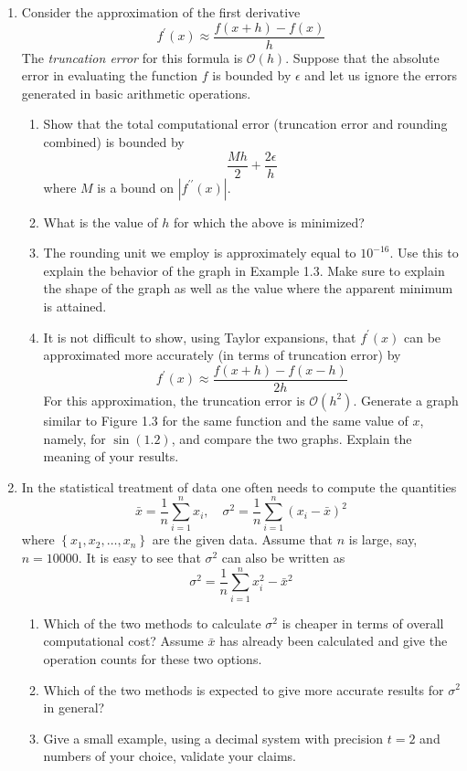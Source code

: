 \documentclass[12pt]{article}
\begin{document}
\begin{enumerate}
\item Consider the approximation of the first derivative
\[
f^{\prime}(x) \approx \frac{f(x+h)-f(x)}{h}
\]
The {\em truncation error} for this formula is $\mathcal{O}(h)$. Suppose that the
absolute error in evaluating the function $f$ is bounded by $\epsilon$ and
let us ignore the errors generated in basic arithmetic operations.
\begin{enumerate}
\item Show that the total computational error (truncation error and rounding combined)
is bounded by
\[
\frac{Mh}{2} + \frac{2\epsilon}{h}
\]
where $M$ is a bound on $\left| f^{\prime\prime}(x)\right|$.
\item What is the value of $h$ for which the above is minimized?
\item The rounding unit we employ is approximately equal to $10^{-16}$. Use this
to explain the behavior of the graph in Example 1.3. Make sure to explain the shape
of the graph as well as the value where the apparent minimum is attained.
\item It is not difficult to show, using Taylor expansions, that $f^{\prime}(x)$ can
be approximated more accurately (in terms of truncation error) by
\[
f^{\prime}(x) \approx \frac{f(x+h) - f(x-h)}{2h}
\]
For this approximation, the truncation error is $\mathcal{O}\left(h^{2}\right)$.
Generate a graph similar to Figure 1.3 for the same function and the same value
of $x$, namely, for $\sin(1.2)$, and compare the two graphs. Explain the meaning
of your results.
\end{enumerate}

\item In the statistical treatment of data one often needs to compute the quantities
\[
\bar{x} = \frac{1}{n}\sum_{i=1}^{n}x_{i},\quad \sigma^{2}=\frac{1}{n}\sum_{i=1}^{n}\left(x_{i}-\bar{x}\right)^{2}
\]
where $\left\{ x_{1}, x_{2}, \ldots, x_{n}\right\}$ are the given data. Assume that $n$
is large, say, $n = 10000$. It is easy to see that $\sigma^{2}$ can also be written as
\[
\sigma^{2} = \frac{1}{n}\sum_{i=1}^{n} x_{i}^{2} - \bar{x}^{2}
\]
\begin{enumerate}
\item Which of the two methods to calculate $\sigma^{2}$ is cheaper in terms of
overall computational cost? Assume $\bar{x}$ has already been calculated and give
the operation counts for these two options.
\item Which of the two methods is expected to give more accurate results for
$\sigma^{2}$ in general?
\item Give a small example, using a decimal system with precision $t = 2$ and
numbers of your choice, validate your claims.
\end{enumerate}
\end{enumerate}
\end{document}
